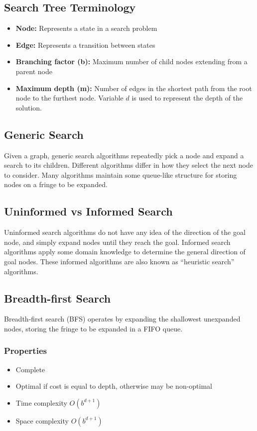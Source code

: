 \documentclass[12pt,titlepage]{article}
\begin{document}
    \subsection{Search Tree Terminology}
      \begin{itemize}
        \item \textbf{Node:} Represents a state in a search problem
        \item \textbf{Edge:} Represents a transition between states
        \item \textbf{Branching factor (b):} Maximum number of child nodes extending from a parent node
        \item \textbf{Maximum depth (m):} Number of edges in the shortest path from the root node to the furthest node.
        Variable $d$ is used to represent the depth of the solution.
      \end{itemize}

    \subsection{Generic Search}
      Given a graph, generic search algorithms repeatedly pick a node and expand a search to its children. Different algorithms
      differ in how they select the next node to consider. Many algorithms maintain some queue-like structure for storing nodes
      on a fringe to be expanded.

    \subsection{Uninformed vs Informed Search}
      Uninformed search algorithms do not have any idea of the direction of the goal node, and simply expand nodes until they
      reach the goal. Informed search algorithms apply some domain knowledge to determine the general direction of goal nodes.
      These informed algorithms are also known as ``heuristic search'' algorithms.

    \subsection{Breadth-first Search}
      Breadth-first search (BFS) operates by expanding the shallowest unexpanded nodes, storing the fringe to be expanded in a FIFO
      queue.

      \subsubsection{Properties}
        \begin{itemize}
          \item Complete
          \item Optimal if cost is equal to depth, otherwise may be non-optimal
          \item Time complexity $O(b^{d+1})$
          \item Space complexity $O(b^{d+1})$
        \end{itemize}
\end{document}
